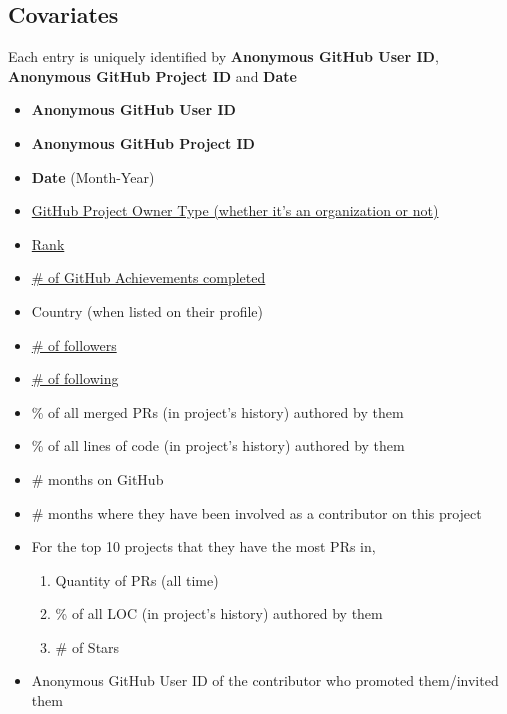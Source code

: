 \documentclass[12pt,notitlepage]{article}
\begin{document}
\subsection*{Covariates}
Each entry is uniquely identified by \textbf{Anonymous GitHub User ID}, \textbf{Anonymous GitHub Project ID} and \textbf{Date}
\begin{itemize}
    \item \textbf{Anonymous GitHub User ID}
    \item \textbf{Anonymous GitHub Project ID}
    \item \textbf{Date} (Month-Year)
    \item \href{https://docs.GitHub.com/en/organizations/collaborating-with-groups-in-organizations/about-organizations}{GitHub Project Owner Type (whether it's an organization or not)}
    \item \href{https://docs.GitHub.com/en/get-started/learning-about-GitHub/access-permissions-on-GitHub}{Rank}
    \item \href{https://GitHub.com/liaochris?tab=achievements}{\# of GitHub Achievements completed}
    \item Country (when listed on their profile)
    \item \href{https://GitHub.com/liaochris?tab=followers}{\# of followers}
    \item \href{https://GitHub.com/liaochris?tab=following}{\# of following}
    \item \% of all merged PRs (in project's history) authored by them 
    \item \% of all lines of code (in project's history) authored by them 
    \item \# months on GitHub
    \item \# months where they have been involved as a contributor on this project
    \item For the top 10 projects that they have the most PRs in, 
    \begin{enumerate}
        \item Quantity of PRs (all time)
        \item \% of all LOC (in project's history) authored by them 
        \item \# of Stars
    \end{enumerate}
    \item Anonymous GitHub User ID of the contributor who promoted them/invited them
\end{itemize}
\end{document}
